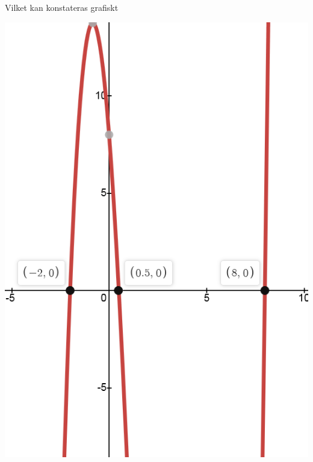 \documentclass[a4paper,12pt]{article}
\begin{document}
\begin{enumerate}
          Vilket kan konstateras grafiskt

          \begin{center}
                \includegraphics[scale=0.4]{Figur 4.png}
          \end{center}

\end{enumerate}
\end{document}
